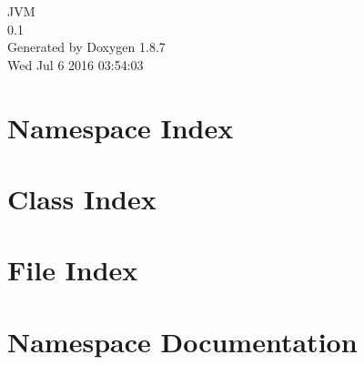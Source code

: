 \documentclass[twoside]{book}
\newcommand{\+}{\discretionary{\mbox{\scriptsize$\hookleftarrow$}}{}{}}
\newcommand{\clearemptydoublepage}{%
  \newpage{\pagestyle{empty}\cleardoublepage}%
}
\begin{document}
\hypersetup{pageanchor=false,
             bookmarks=true,
             bookmarksnumbered=true,
             pdfencoding=unicode
            }
\begin{titlepage}
\vspace*{7cm}
\begin{center}%
{\Large J\+V\+M \\[1ex]\large 0.\+1 }\\
\vspace*{1cm}
{\large Generated by Doxygen 1.8.7}\\
\vspace*{0.5cm}
{\small Wed Jul 6 2016 03:54:03}\\
\end{center}
\end{titlepage}
\clearemptydoublepage
\tableofcontents
\clearemptydoublepage
{}
\hypersetup{pageanchor=true}

\chapter{Namespace Index}

\chapter{Class Index}

\chapter{File Index}

\chapter{Namespace Documentation}

\end{document}
